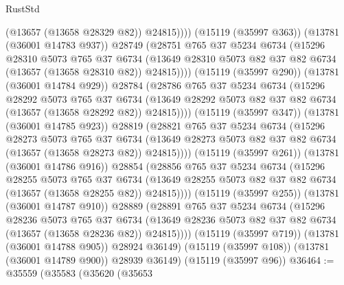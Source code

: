 \begin{lexlean}{RustStd}
\begin{coremodule}
                          (@13657 (@13658 @28329 @82))
                          @24815))))
                  (@15119 (@35997 @363))
                  (@13781 (@36001 @14783 @937))
                  @28749
                  (@28751
                    @765
                    @37
                    @5234
                    @6734
                    (@15296
                      @28310
                      @5073
                      @765
                      @37
                      @6734
                      (@13649 @28310 @5073 @82 @37 @82 @6734 (@13657 (@13658 @28310 @82)) @24815))))
                (@15119 (@35997 @290))
                (@13781 (@36001 @14784 @929))
                @28784
                (@28786
                  @765
                  @37
                  @5234
                  @6734
                  (@15296
                    @28292
                    @5073
                    @765
                    @37
                    @6734
                    (@13649 @28292 @5073 @82 @37 @82 @6734 (@13657 (@13658 @28292 @82)) @24815))))
              (@15119 (@35997 @347))
              (@13781 (@36001 @14785 @923))
              @28819
              (@28821
                @765
                @37
                @5234
                @6734
                (@15296
                  @28273
                  @5073
                  @765
                  @37
                  @6734
                  (@13649 @28273 @5073 @82 @37 @82 @6734 (@13657 (@13658 @28273 @82)) @24815))))
            (@15119 (@35997 @261))
            (@13781 (@36001 @14786 @916))
            @28854
            (@28856
              @765
              @37
              @5234
              @6734
              (@15296
                @28255
                @5073
                @765
                @37
                @6734
                (@13649 @28255 @5073 @82 @37 @82 @6734 (@13657 (@13658 @28255 @82)) @24815))))
          (@15119 (@35997 @255))
          (@13781 (@36001 @14787 @910))
          @28889
          (@28891
            @765
            @37
            @5234
            @6734
            (@15296
              @28236
              @5073
              @765
              @37
              @6734
              (@13649 @28236 @5073 @82 @37 @82 @6734 (@13657 (@13658 @28236 @82)) @24815))))
        (@15119 (@35997 @719))
        (@13781 (@36001 @14788 @905))
        @28924
        @36149)
      (@15119 (@35997 @108))
      (@13781 (@36001 @14789 @900))
      @28939
      @36149)
    (@15119 (@35997 @96))
@36464 := @35559
    (@35583
      (@35620
        (@35653

\end{coremodule}
\end{lexlean}

